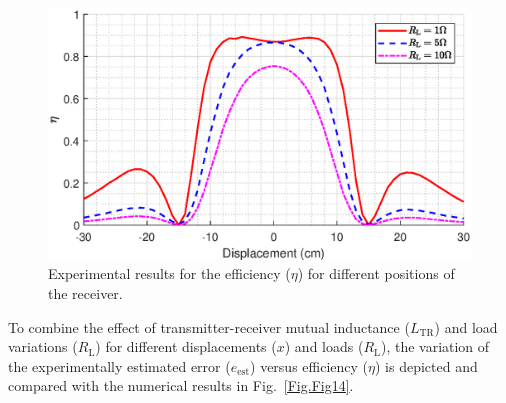 \documentclass[journal,a4paper]{IEEEtran}
\begin{document}
\begin{figure}[t!]
\begin{center}
	\includegraphics[clip, trim=1cm 0.0cm 1cm 0.0cm, width=1\columnwidth]{Figs/Fig13.eps}
\end{center}
\vspace{-0.1cm}
	\caption{Experimental results for the efficiency ($\eta$) for different positions of the receiver.}
		\label{Fig.Fig13}
		\vspace{-3mm}
\end{figure}

To combine the effect of transmitter-receiver mutual inductance ($L_{\mathrm{TR}}$) and load variations ($R_{\mathrm{L}}$) for different displacements ($x$) and loads ($R_{\mathrm{L}}$), the variation of the experimentally estimated error ($e_{\mathrm{est}}$) versus efficiency ($\eta$) is depicted and compared with the numerical results in Fig.~\ref{Fig.Fig14}.
\end{document}
